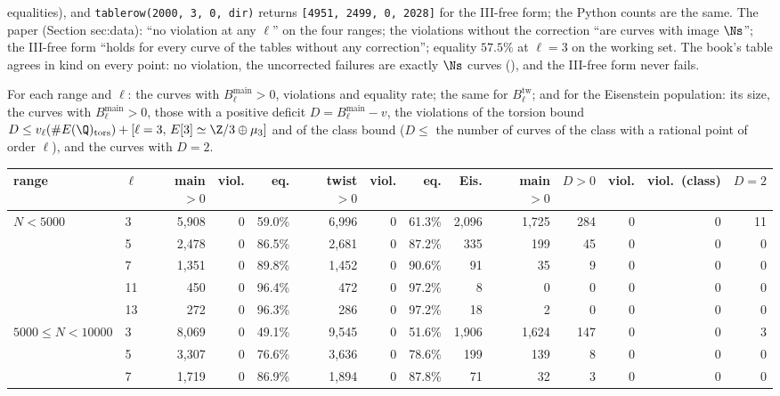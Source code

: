 \begin{sloppypar}
\begin{example}
equalities), and \texttt{tablerow(2000, 3, 0, dir)} returns \texttt{[4951, 2499, 0, 2028]} for the III-free form; the Python counts are the
same. The paper (Section sec:data): ``no violation at any $\ell$'' on the four ranges; the violations without the correction ``are curves with image
$\Ns$''; the III-free form ``holds for every curve of the tables without any correction''; equality $57.5\%$ at $\ell=3$ on the working set. The
book's table agrees in kind on every point: no violation, the uncorrected failures are exactly $\Ns$ curves (), and
the III-free form never fails.
\end{example}

\begin{example}\label{ex:computation:repro-counts}
For each range and $\ell$: the curves with $B^{\mathrm{main}}_\ell>0$, violations and equality rate; the same for $B^{\mathrm{tw}}_\ell$; and for the Eisenstein
population: its size, the curves with $B^{\mathrm{main}}_\ell>0$, those with a positive deficit $D=B^{\mathrm{main}}_\ell-v$, the violations of the torsion bound
$D\le v_\ell(\#E(\Q)_{\mathrm{tors}})+[\ell=3,\,E[3]\simeq\Z/3\oplus\mu_3]$ and of the class bound ($D\le$ the number of curves of the class with a rational point of order
$\ell$), and the curves with $D=2$.
\begin{center}\scriptsize\setlength{\tabcolsep}{2.5pt}
\begin{tabular}{llrrrrrrrrrrrr}
\toprule
range & $\ell$ & main $>0$ & viol. & eq. & twist $>0$ & viol. & eq. & Eis. & main $>0$ & $D>0$ & viol. & viol.\ (class) & $D=2$\\
\midrule
$N<5000$ & 3 & 5,908 & 0 & 59.0\% & 6,996 & 0 & 61.3\% & 2,096 & 1,725 & 284 & 0 & 0 & 11\\
 & 5 & 2,478 & 0 & 86.5\% & 2,681 & 0 & 87.2\% & 335 & 199 & 45 & 0 & 0 & 0\\
 & 7 & 1,351 & 0 & 89.8\% & 1,452 & 0 & 90.6\% & 91 & 35 & 9 & 0 & 0 & 0\\
 & 11 & 450 & 0 & 96.4\% & 472 & 0 & 97.2\% & 8 & 0 & 0 & 0 & 0 & 0\\
 & 13 & 272 & 0 & 96.3\% & 286 & 0 & 97.2\% & 18 & 2 & 0 & 0 & 0 & 0\\
$5000\le N<10000$ & 3 & 8,069 & 0 & 49.1\% & 9,545 & 0 & 51.6\% & 1,906 & 1,624 & 147 & 0 & 0 & 3\\
 & 5 & 3,307 & 0 & 76.6\% & 3,636 & 0 & 78.6\% & 199 & 139 & 8 & 0 & 0 & 0\\
 & 7 & 1,719 & 0 & 86.9\% & 1,894 & 0 & 87.8\% & 71 & 32 & 3 & 0 & 0 & 0\\

\end{tabular}
\end{center}
\end{example}
\end{sloppypar}

